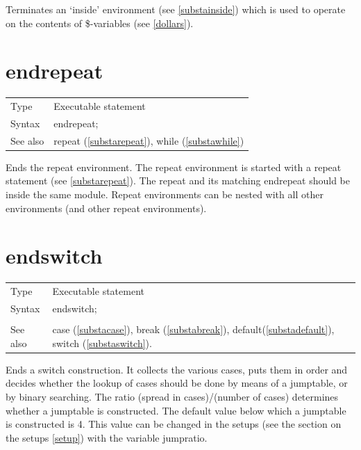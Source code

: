 \noindent Terminates an `inside' 
environment (see \ref{substainside}) which is 
used to operate on the contents of \$-variables (see 
\ref{dollars}).\vspace{10mm}


\section{endrepeat}
\label{substaendrepeat}

\noindent \begin{tabular}{ll}
Type & Executable statement\\
Syntax & endrepeat;
\\ See also & repeat (\ref{substarepeat}), while (\ref{substawhile})
\end{tabular} \vspace{4mm}

\noindent Ends the repeat 
environment. The repeat environment is started 
with a repeat statement (see \ref{substarepeat}). The repeat and its 
matching endrepeat should be inside the same module. 
Repeat environments can be nested with all other environments (and other 
repeat environments). \vspace{10mm}

%
\section{endswitch}
\label{substaendswitch}

\noindent \begin{tabular}{ll}
Type & Executable statement\\
Syntax & endswitch; \\
\\ See also & case (\ref{substacase}), break (\ref{substabreak}),
		 default(\ref{substadefault}), switch (\ref{substaswitch}).
\end{tabular} \vspace{4mm}

\noindent Ends a switch construction. It collects the various cases, puts 
them in order and decides whether the lookup of cases should be done by 
means of a jumptable, or by binary searching. The ratio (spread in 
cases)/(number of cases) determines whether a jumptable is constructed. The 
default value below which a jumptable is constructed is 4. This value can 
be changed in the setups (see the section on the setups \ref{setup}) with 
the variable jumpratio.

